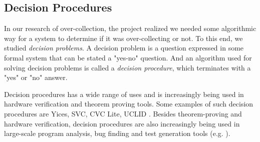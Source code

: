 







\subsection{Decision Procedures}

In our research of over-collection, the project realized we needed some algorithmic way for a system to determine if it was over-collecting or not. To this end, we studied \textit{decision problems}. A decision problem is a question expressed in some formal system that can be stated a "yes-no" question. And an algorithm used for solving decision problems is called a \textit{decision procedure}, which terminates with a "yes" or "no" answer\cite{decisionproceduresbook}. 

Decision procedures has a wide range of uses and is increasingly being used in hardware verification and theorem proving tools\cite{ganesh2007decision}. Some examples of such decision procedures are Yices, SVC, CVC Lite, UCLID \cite{dutertre2006fast, barrett1996validity, barrett2004cvc, lahiri2004uclid}. Besides theorem-proving and hardware verification, decision procedures are also increasingly being used in large-scale program analysis, bug finding and test generation tools (e.g. \cite{newsome2006replayer, cadar2008exe}).







